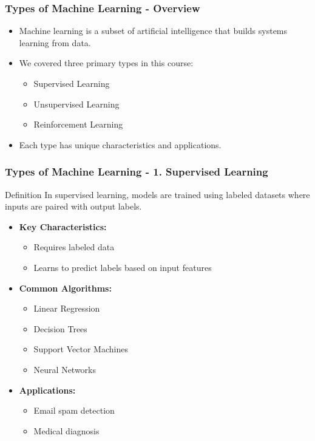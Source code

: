 \documentclass[aspectratio=169]{beamer}
\begin{document}
\begin{frame}[fragile]
    \frametitle{Types of Machine Learning - Overview}
    \begin{itemize}
        \item Machine learning is a subset of artificial intelligence that builds systems learning from data.
        \item We covered three primary types in this course:
        \begin{itemize}
            \item Supervised Learning
            \item Unsupervised Learning
            \item Reinforcement Learning
        \end{itemize}
        \item Each type has unique characteristics and applications.
    \end{itemize}
\end{frame}

\begin{frame}[fragile]
    \frametitle{Types of Machine Learning - 1. Supervised Learning}
    \begin{block}{Definition}
        In supervised learning, models are trained using labeled datasets where inputs are paired with output labels.
    \end{block}
    
    \begin{itemize}
        \item \textbf{Key Characteristics:}
        \begin{itemize}
            \item Requires labeled data
            \item Learns to predict labels based on input features
        \end{itemize}
        \item \textbf{Common Algorithms:}
        \begin{itemize}
            \item Linear Regression
            \item Decision Trees
            \item Support Vector Machines
            \item Neural Networks
        \end{itemize}
        \item \textbf{Applications:}
        \begin{itemize}
            \item Email spam detection
            \item Medical diagnosis
        \end{itemize}
    \end{itemize}
\end{frame}
\end{document}
